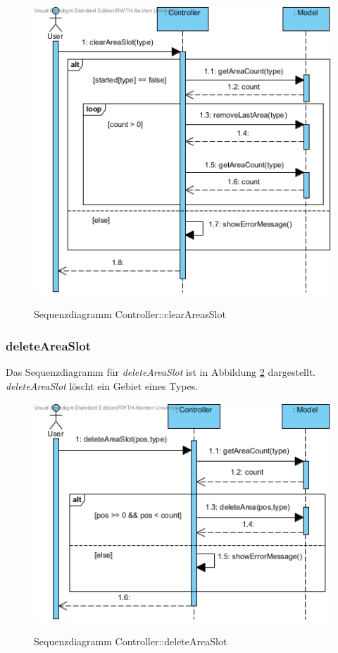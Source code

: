 \begin{figure}[H]
	\centering
	\includegraphics[scale=.6]{Bilder/Controller__clearAreasSlot().jpg}\\
	\caption{Sequenzdiagramm Controller::clearAreasSlot}
	\label{Sequenzdiagramm Controller::clearAreasSlot}
\end{figure}

\subsubsection*{deleteAreaSlot}

Das Sequenzdiagramm für \emph{deleteAreaSlot} ist in Abbildung \ref{Sequenzdiagramm Controller::deleteAreaSlot} dargestellt. \emph{deleteAreaSlot} löscht ein Gebiet eines Types.

\begin{figure}[H]
	\centering
	\includegraphics[scale=.85]{Bilder/Controller__deleteAreaSlot().jpg}\\
	\caption{Sequenzdiagramm Controller::deleteAreaSlot}
	\label{Sequenzdiagramm Controller::deleteAreaSlot}
\end{figure}

